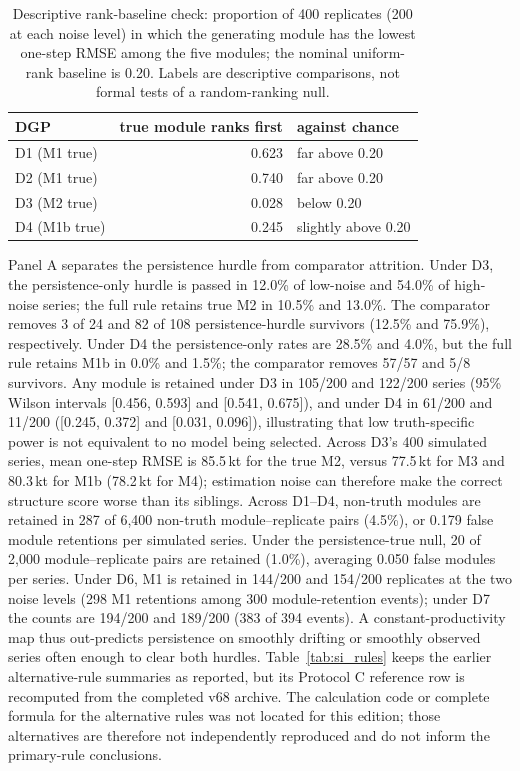 \documentclass[preprint,11pt,authoryear]{elsarticle}
\theoremstyle{remark}
\begin{document}
\begin{table}[!htb]
\centering\footnotesize\setlength{\tabcolsep}{3.5pt}
\caption{Descriptive rank-baseline check: proportion of 400 replicates (200 at each noise level) in which the generating module has the lowest one-step RMSE among the five modules; the nominal uniform-rank baseline is 0.20. Labels are descriptive comparisons, not formal tests of a random-ranking null.}
\label{tab:si_chance}
\begin{tabular}{@{}lrl@{}}
\toprule
DGP & true module ranks first & against chance \\
\midrule
D1 (M1 true) & 0.623 & far above 0.20 \\
D2 (M1 true) & 0.740 & far above 0.20 \\
D3 (M2 true) & 0.028 & below 0.20 \\
D4 (M1b true) & 0.245 & slightly above 0.20 \\
\bottomrule
\end{tabular}
\end{table}

Panel A separates the persistence hurdle from comparator attrition. Under D3, the persistence-only hurdle is passed in 12.0\% of low-noise and 54.0\% of high-noise series; the full rule retains true M2 in 10.5\% and 13.0\%. The comparator removes 3 of 24 and 82 of 108 persistence-hurdle survivors (12.5\% and 75.9\%), respectively. Under D4 the persistence-only rates are 28.5\% and 4.0\%, but the full rule retains M1b in 0.0\% and 1.5\%; the comparator removes 57/57 and 5/8 survivors. Any module is retained under D3 in 105/200 and 122/200 series (95\% Wilson intervals [0.456, 0.593] and [0.541, 0.675]), and under D4 in 61/200 and 11/200 ([0.245, 0.372] and [0.031, 0.096]), illustrating that low truth-specific power is not equivalent to no model being selected. Across D3's 400 simulated series, mean one-step RMSE is 85.5\,kt for the true M2, versus 77.5\,kt for M3 and 80.3\,kt for M1b (78.2\,kt for M4); estimation noise can therefore make the correct structure score worse than its siblings. Across D1--D4, non-truth modules are retained in 287 of 6,400 non-truth module--replicate pairs (4.5\%), or 0.179 false module retentions per simulated series. Under the persistence-true null, 20 of 2,000 module--replicate pairs are retained (1.0\%), averaging 0.050 false modules per series. Under D6, M1 is retained in 144/200 and 154/200 replicates at the two noise levels (298 M1 retentions among 300 module-retention events); under D7 the counts are 194/200 and 189/200 (383 of 394 events). A constant-productivity map thus out-predicts persistence on smoothly drifting or smoothly observed series often enough to clear both hurdles. Table~\ref{tab:si_rules} keeps the earlier alternative-rule summaries as reported, but its Protocol C reference row is recomputed from the completed v68 archive. The calculation code or complete formula for the alternative rules was not located for this edition; those alternatives are therefore not independently reproduced and do not inform the primary-rule conclusions.
\end{document}
